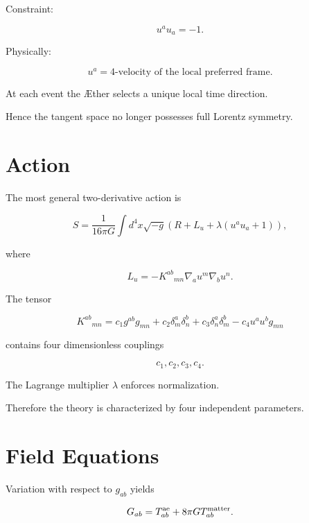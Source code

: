 \documentclass[11pt,a4paper]{article}
\begin{document}
Constraint:

\begin{equation}
u^a u_a=-1.
\end{equation}

Physically:

\begin{equation}
u^a=
\text{4-velocity of the local preferred frame}.
\end{equation}

At each event the \AE ther selects a unique local time direction.

Hence the tangent space no longer possesses full Lorentz symmetry.

\section{Action}

The most general two-derivative action is

\begin{equation}
S=
\frac{1}{16\pi G}
\int d^4x
\sqrt{-g}
\left(
R + L_u
+\lambda(u^a u_a+1)
\right),
\end{equation}

where

\begin{equation}
L_u=
-K^{ab}{}_{mn}
\nabla_a u^m
\nabla_b u^n .
\end{equation}

The tensor

\begin{equation}
K^{ab}{}_{mn}
=
c_1 g^{ab}g_{mn}
+c_2 \delta^a_m\delta^b_n
+c_3 \delta^a_n\delta^b_m
-c_4 u^a u^b g_{mn}
\end{equation}

contains four dimensionless couplings

\begin{equation}
c_1,c_2,c_3,c_4.
\end{equation}

The Lagrange multiplier $\lambda$
enforces normalization.

Therefore the theory is characterized by four independent parameters.

\section{Field Equations}

Variation with respect to $g_{ab}$ yields

\begin{equation}
G_{ab}
=
T^{\rm ae}_{ab}
+
8\pi G T^{\rm matter}_{ab}.
\end{equation}
\end{document}
